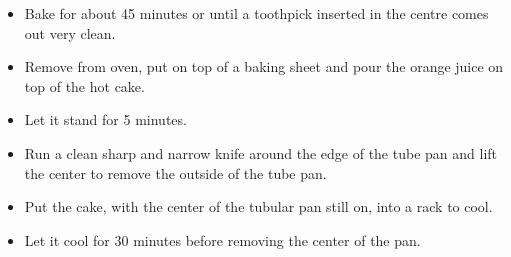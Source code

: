 \documentclass[11pt,letterpaper]{article}
\newcommand \fileName {OrangeCake}
\begin{document}
\begin{description}
\begin{enumerate}
\begin{itemize}
		\item Bake for about 45 minutes or until a toothpick inserted in the centre comes out very clean. 
		\item Remove from oven, put on top of a baking sheet and pour the orange juice on top of the hot cake.
		\item Let it stand for 5 minutes.
		\item Run a clean sharp and narrow knife around the edge of the tube pan and lift the center to remove the outside of the tube pan.
		\item Put the cake, with the center of the tubular pan still on, into a rack to cool.
		\item Let it cool for 30 minutes before removing the center of the pan.
		\end{itemize}
	\end{enumerate}
\end{description}


\end{document}
